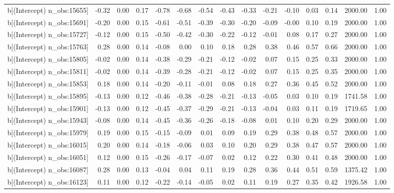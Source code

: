 \begin{table}[ht]
\begin{tabular}{rrrrrrrrrrrrrrr}
  b[(Intercept) n\_obs:15655] & -0.32 & 0.00 & 0.17 & -0.78 & -0.68 & -0.54 & -0.43 & -0.33 & -0.21 & -0.10 & 0.03 & 0.14 & 2000.00 & 1.00 \\ 
  b[(Intercept) n\_obs:15691] & -0.20 & 0.00 & 0.15 & -0.61 & -0.51 & -0.39 & -0.30 & -0.20 & -0.09 & -0.00 & 0.10 & 0.19 & 2000.00 & 1.00 \\ 
  b[(Intercept) n\_obs:15727] & -0.12 & 0.00 & 0.15 & -0.50 & -0.42 & -0.30 & -0.22 & -0.12 & -0.01 & 0.08 & 0.17 & 0.27 & 2000.00 & 1.00 \\ 
  b[(Intercept) n\_obs:15763] & 0.28 & 0.00 & 0.14 & -0.08 & 0.00 & 0.10 & 0.18 & 0.28 & 0.38 & 0.46 & 0.57 & 0.66 & 2000.00 & 1.00 \\ 
  b[(Intercept) n\_obs:15805] & -0.02 & 0.00 & 0.14 & -0.38 & -0.29 & -0.21 & -0.12 & -0.02 & 0.07 & 0.15 & 0.25 & 0.33 & 2000.00 & 1.00 \\ 
  b[(Intercept) n\_obs:15811] & -0.02 & 0.00 & 0.14 & -0.39 & -0.28 & -0.21 & -0.12 & -0.02 & 0.07 & 0.15 & 0.25 & 0.35 & 2000.00 & 1.00 \\ 
  b[(Intercept) n\_obs:15853] & 0.18 & 0.00 & 0.14 & -0.20 & -0.11 & -0.01 & 0.08 & 0.18 & 0.27 & 0.36 & 0.45 & 0.52 & 2000.00 & 1.00 \\ 
  b[(Intercept) n\_obs:15895] & -0.13 & 0.00 & 0.12 & -0.46 & -0.38 & -0.28 & -0.21 & -0.13 & -0.05 & 0.03 & 0.10 & 0.19 & 1741.58 & 1.00 \\ 
  b[(Intercept) n\_obs:15901] & -0.13 & 0.00 & 0.12 & -0.45 & -0.37 & -0.29 & -0.21 & -0.13 & -0.04 & 0.03 & 0.11 & 0.19 & 1719.65 & 1.00 \\ 
  b[(Intercept) n\_obs:15943] & -0.08 & 0.00 & 0.14 & -0.45 & -0.36 & -0.26 & -0.18 & -0.08 & 0.01 & 0.10 & 0.20 & 0.29 & 2000.00 & 1.00 \\ 
  b[(Intercept) n\_obs:15979] & 0.19 & 0.00 & 0.15 & -0.15 & -0.09 & 0.01 & 0.09 & 0.19 & 0.29 & 0.38 & 0.48 & 0.57 & 2000.00 & 1.00 \\ 
  b[(Intercept) n\_obs:16015] & 0.20 & 0.00 & 0.14 & -0.18 & -0.06 & 0.03 & 0.10 & 0.20 & 0.29 & 0.38 & 0.47 & 0.57 & 2000.00 & 1.00 \\ 
  b[(Intercept) n\_obs:16051] & 0.12 & 0.00 & 0.15 & -0.26 & -0.17 & -0.07 & 0.02 & 0.12 & 0.22 & 0.30 & 0.41 & 0.48 & 2000.00 & 1.00 \\ 
  b[(Intercept) n\_obs:16087] & 0.28 & 0.00 & 0.13 & -0.04 & 0.04 & 0.11 & 0.19 & 0.28 & 0.36 & 0.44 & 0.51 & 0.59 & 1375.42 & 1.00 \\ 
  b[(Intercept) n\_obs:16123] & 0.11 & 0.00 & 0.12 & -0.22 & -0.14 & -0.05 & 0.02 & 0.11 & 0.19 & 0.27 & 0.35 & 0.42 & 1926.58 & 1.00 \\ 

\end{tabular}
\end{table}
